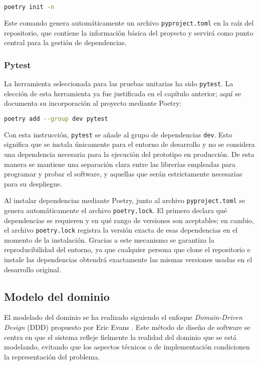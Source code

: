 \begin{lstlisting}[language=bash]
poetry init -n
\end{lstlisting}

Este comando genera automáticamente un archivo \texttt{pyproject.toml} en la raíz del
repositorio, que contiene la información básica del proyecto y servirá como punto central
para la gestión de dependencias.

\subsubsection{Pytest}
La herramienta seleccionada para las pruebas unitarias ha sido \texttt{pytest}.
La elección de esta herramienta ya fue justificada en el capítulo anterior; aquí se documenta su 
incorporación al proyecto mediante Poetry:

\begin{lstlisting}[language=bash]
poetry add --group dev pytest
\end{lstlisting}

Con esta instrucción, \texttt{pytest} se añade al grupo de dependencias \texttt{dev}. Esto significa
que se instala únicamente para el entorno de desarrollo y no se considera una dependencia necesaria
para la ejecución del prototipo en producción. De esta manera se mantiene una separación clara entre
las librerías empleadas para programar y probar el software, y aquellas que serán estrictamente
necesarias para su despliegue.

Al instalar dependencias mediante Poetry, junto al archivo \texttt{pyproject.toml} se genera 
automáticamente el archivo \texttt{poetry.lock}. El primero declara qué dependencias se requieren y 
en qué rango de versiones son aceptables; en cambio, el archivo \texttt{poetry.lock} registra la 
versión exacta de esas dependencias en el momento de la instalación. Gracias a este mecanismo se 
garantiza la reproducibilidad del entorno, ya que cualquier persona que clone el repositorio e 
instale las dependencias obtendrá exactamente las mismas versiones usadas en el desarrollo 
original.

\subsection{Modelo del dominio}
El modelado del dominio se ha realizado siguiendo el enfoque \textit{Domain-Driven Design} (DDD)
propuesto por Eric Evans \cite{evansDDD}. Este método de diseño de software se centra en que
el sistema refleje fielmente la realidad del dominio que se está modelando, evitando que los 
aspectos técnicos o de implementación condicionen la representación del problema.

